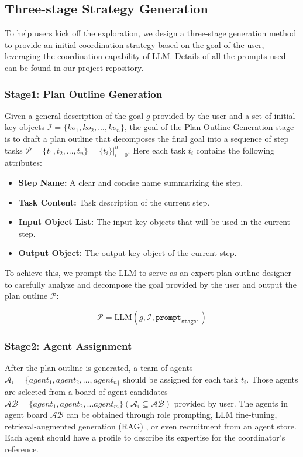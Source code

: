 \subsection{Three-stage Strategy Generation}
\label{sec4.2:Three-stage Strategy Generation}
To help users kick off the exploration, we design a three-stage generation method to provide an initial coordination strategy based on the goal of the user, leveraging the coordination capability of LLM. Details of all the prompts used can be found in our project repository.

\subsubsection{Stage1: Plan Outline Generation}
Given a general description of the goal $g$ provided by the user and a set of initial key objects $\mathcal{I} = \{ko_{1},ko_{2}, ..., ko_{n}\}$, the goal of the Plan Outline Generation stage is to draft a plan outline that decomposes the final goal into a sequence of step tasks $\mathcal{P} = \{t_{1},t_{2}, ..., t_{n}\} = \{t_{i}\}|_{i=0}^{n} $. Here each task $t_{i}$ contains the following attributes:
\begin{itemize}

\item \textbf{Step Name:} A clear and concise name summarizing the step.
\item \textbf{Task Content:} Task description of the current step.
\item \textbf{Input Object List:} The input key objects that will be used in the current step.
\item \textbf{Output Object:} The output key object of the current step.

\end{itemize}

To achieve this, we prompt the LLM to serve as an expert plan outline designer to carefully analyze and decompose the goal provided by the user and output the plan outline $\mathcal{P}$:

\begin{equation}
         \mathcal{P} = \text{LLM} ( g, \mathcal{I}, \texttt{prompt}_\texttt{stage1}) 
\end{equation}


\subsubsection{Stage2: Agent Assignment}
After the plan outline is generated, a team of agents $\mathcal{A}_{i} = \{agent_{1}, agent_{2}, ..., agent_{n\}}$ should be assigned for each task $t_{i}$. Those agents are selected from a board of agent candidates $\mathcal{AB} = \{agent_{1}, agent_{2}, ... agent_{m}\} (\mathcal{A}_{i} \subseteq \mathcal{AB} )$ provided by user. The agents in agent board $\mathcal{AB}$ can be obtained through role prompting\cite{Expertprompting}, LLM fine-tuning\cite{wei2021finetuned}, retrieval-augmented generation (RAG) \cite{lewis2020retrieval}, or even recruitment from an agent store\cite{NexusGPT,GPT-Store,SuperAGI-Marketplace}. Each agent should have a profile to describe its expertise for the coordinator's reference.

